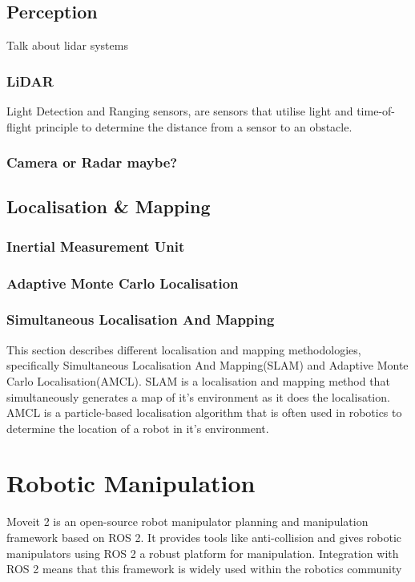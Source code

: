 \subsection{Perception}
Talk about lidar systems
\subsubsection{LiDAR}
Light Detection and Ranging sensors, are sensors that utilise light and time-of-flight principle to determine the distance from a sensor to an obstacle. 

\subsubsection{Camera or Radar maybe?}


\subsection{Localisation \& Mapping}


\subsubsection{Inertial Measurement Unit}


\subsubsection{Adaptive Monte Carlo Localisation}


\subsubsection{Simultaneous Localisation And Mapping}
This section describes different localisation and mapping methodologies, specifically Simultaneous Localisation And Mapping(SLAM) and Adaptive Monte Carlo Localisation(AMCL). SLAM is a localisation and mapping method that simultaneously generates a map of it's environment as it does the localisation. AMCL is a particle-based localisation algorithm that is often used in robotics to determine the location of a robot in it's environment.

\section{Robotic Manipulation}
Moveit 2 is an open-source robot manipulator planning and manipulation framework based on ROS 2. It provides tools like anti-collision and gives robotic manipulators using  ROS 2 a robust platform for manipulation. Integration with ROS 2 means that this framework is widely used within the robotics community

